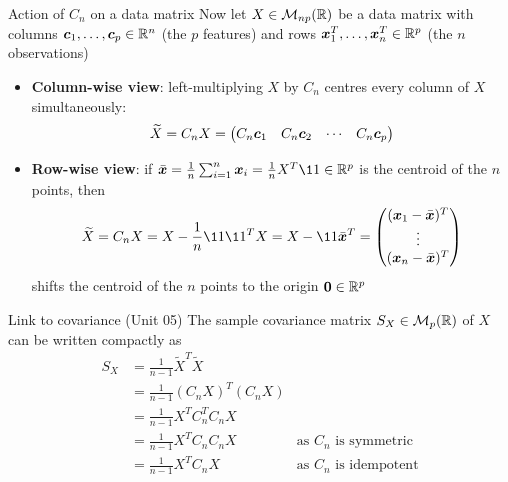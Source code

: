 \documentclass[aspectratio=169]{beamer}\usepackage[]{graphicx}\usepackage[]{xcolor}
\begin{document}
\begin{frame}{Action of $C_n$ on a data matrix}
Now let $X\in\mathcal{M}_{np}(\mathbb{R})$ be a data matrix with columns $\bm{c}_1,\ldots,\bm{c}_p\in\mathbb{R}^n$ (the $p$ features) and rows $\bm{x}_1^T,\ldots,\bm{x}_n^T\in\mathbb{R}^p$ (the $n$ observations)
\vfill
\begin{itemize}
\item \textbf{Column-wise view}: left-multiplying $X$ by $C_n$ centres every column of $X$ simultaneously:
\[
\widetilde{X} = C_n X = \begin{pmatrix} C_n\bm{c}_1 & C_n\bm{c}_2 & \cdots & C_n\bm{c}_p \end{pmatrix}
\]
\vfill
\item \textbf{Row-wise view}: if $\bar{\bx} = \frac{1}{n}\sum_{i=1}^n \bx_i = \frac{1}{n}X^T\11\in\IR^p$ is the centroid of the $n$ points, then
\[
\widetilde{X} = C_n X = X - \frac{1}{n}\11\11^T X = X - \11\bar{\bx}^T = \begin{pmatrix} (\bx_1 - \bar{\bx})^T \\ \vdots \\ (\bx_n - \bar{\bx})^T \end{pmatrix}
\]
shifts the centroid of the $n$ points to the origin $\b0\in\IR^p$
\end{itemize}
\end{frame}

\begin{frame}{Link to covariance (Unit 05)}
The sample covariance matrix $S_X\in\mathcal{M}_p(\mathbb{R})$ of $X$ can be written compactly as
\begin{align*}
S_X &= \frac{1}{n-1}\widetilde{X}^T\widetilde{X} \\
&= \frac{1}{n-1}(C_n X)^T(C_n X) \\
&= \frac{1}{n-1}X^T C_n^T C_n X \\
&= \frac{1}{n-1}X^T C_n C_n X &\textrm{as $C_n$ is symmetric}\\
&= \frac{1}{n-1}X^T C_n X &\textrm{as $C_n$ is idempotent}
\end{align*}
\end{frame}



\end{document}
